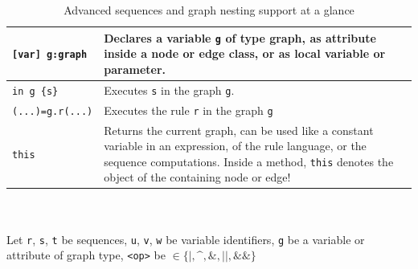 \begin{table}[htbp]
\begin{minipage}{\linewidth}
\begin{tabularx}{\linewidth}{|lX|}
\hline
\hline
\texttt{[var] g:graph}	& Declares a variable \texttt{g} of type graph, as attribute inside a node or edge class, or as local variable or parameter.\\
\hline
\texttt{in g \{s\}}	& Executes \texttt{s} in the graph \texttt{g}.\\
\hline
\texttt{(...)=g.r(...)} & Executes the rule \texttt{r} in the graph \texttt{g}\\
\hline
\texttt{this} & Returns the current graph, can be used like a constant variable in an expression, of the rule language, or the sequence computations. Inside a method, \texttt{this} denotes the object of the containing node or edge!\\
\hline
\end{tabularx}\indexmain{\texttt{<>}}\indexmain{\texttt{<<;>>}}
\end{minipage}\\
\\ 
{\small Let \texttt{r}, \texttt{s}, \texttt{t} be sequences, \texttt{u}, \texttt{v}, \texttt{w} be variable identifiers, \texttt{g} be a variable or attribute of graph type, \texttt{<op>} be $\in \{\texttt{|}, \texttt{\textasciicircum}, \texttt{\&}, \texttt{||}, \texttt{\&\&}\}$ }%
\caption{Advanced sequences and graph nesting support at a glance}
\label{seqtab}
\end{table}
 
